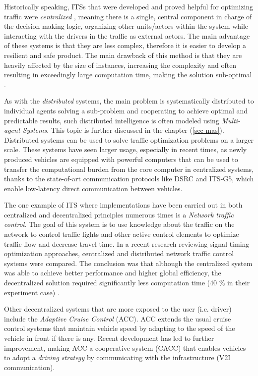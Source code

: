 \documentclass[main.tex]{subfiles}
\begin{document}
Historically speaking, ITSs that were
developed and proved helpful for optimizing traffic were \emph{centralized} \cite{Corman2010}, meaning there is a
single, central component in charge of the decision-making logic, organizing other units/actors within the
system while interacting with the drivers in the traffic as external actors. The main
advantage of these systems is that they are less complex, therefore it is easier to develop a resilient and
safe product. The main drawback of this method is that they are heavily affected by the size
of instances, increasing the complexity and often resulting in exceedingly large computation time,
making the solution sub-optimal \cite{Corman2010}. 

As with the \emph{distributed} systems, the main problem is systematically distributed to
individual agents solving a sub-problem and cooperating to achieve optimal and predictable
results, such distributed intelligence is often modeled using \emph{Multi-agent Systems}.  This
topic is further discussed in the chapter (\ref{sec-mas}). Distributed systems can be used to
solve traffic optimization problems on a larger scale. These systems have seen larger usage,
especially in recent times, as newly produced vehicles are equipped with powerful computers
that can be used to transfer the computational burden from the core computer in centralized
systems, thanks to the state-of-art communication protocols like DSRC and ITS-G5, which enable
low-latency direct communication between vehicles. 

The one example of ITS where implementations have been carried out in both centralized and 
decentralized principles numerous times is a \emph{Network traffic control}. The goal of this 
system is to use knowledge about the traffic on the network to control traffic lights and other 
active control elements to optimize traffic flow and decrease travel time. In a recent research 
reviewing signal timing optimization approaches, centralized and distributed network traffic
control systems were compared. The conclusion was that although the centralized system was able
to achieve better performance and higher global efficiency, the decentralized solution required
significantly less computation time (40 \% in their experiment case) \cite{Chow2019}.

Other decentralized systems that are more exposed to the user (i.e. driver) include the 
\emph{Adaptive Cruise Control} (ACC). ACC extends the usual cruise control systems 
that maintain vehicle speed by adapting to the speed of the vehicle in front if there is any.  
Recent development has led to further improvement, making ACC a cooperative system (CACC) that 
enables vehicles to adopt a \emph{driving strategy} by communicating with the infrastructure (V2I 
communication).
\end{document}
